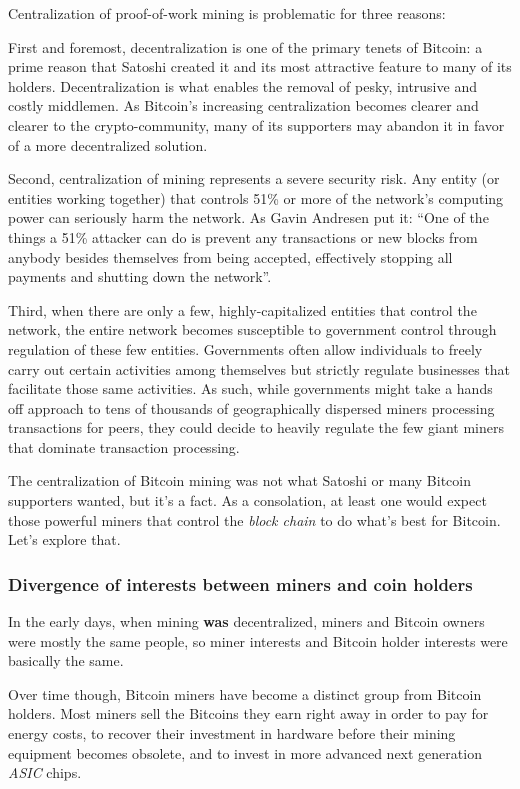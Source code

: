 \documentclass[a4paper,11pt]{article}
\begin{document}
Centralization of proof-of-work mining is problematic for three reasons: 

First and foremost, decentralization is one of the primary tenets of Bitcoin: a prime reason that Satoshi created it and its most attractive feature to many of its holders. Decentralization is what enables the removal of pesky, intrusive and costly middlemen. As Bitcoin's increasing centralization becomes clearer and clearer to the crypto-community, many of its supporters may abandon it in favor of a more decentralized solution.

Second, centralization of mining represents a severe security risk. Any entity (or entities working together) that controls 51\% or more of the network's computing power can seriously harm the network. As Gavin Andresen put it: ``One of the things a 51\% attacker can do is prevent any transactions or new blocks from anybody besides themselves from being accepted, effectively stopping all payments and shutting down the network''\cite{gavin51}.

Third, when there are only a few, highly-capitalized entities that control the network, the entire network becomes susceptible to government control through regulation of these few entities. 
Governments often allow individuals to freely carry out certain activities among themselves but strictly regulate businesses that facilitate those same activities. As such, while governments might take a hands off approach to tens of thousands of geographically dispersed miners processing transactions for peers, they could decide to heavily regulate the few giant miners that dominate transaction processing.  

The centralization of Bitcoin mining was not what Satoshi or many Bitcoin supporters wanted, but it's a fact. As a consolation, at least one would expect those powerful miners that control the \textit{block chain} to do what's best for Bitcoin. Let's explore that.

\subsubsection{Divergence of interests between miners and coin holders}

In the early days, when mining \textbf{was} decentralized, miners and Bitcoin owners were mostly the same people, so miner interests and Bitcoin holder interests were basically the same. 

Over time though, Bitcoin miners have become a distinct group from Bitcoin holders. Most miners sell the Bitcoins they earn right away in order to pay for energy costs, to recover their investment in hardware before their mining equipment becomes obsolete, and to invest in more advanced next generation \textit{ASIC} chips.
\end{document}
